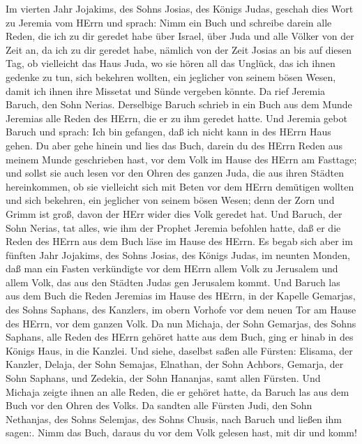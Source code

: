  Im vierten Jahr Jojakims, des Sohns Josias, des Königs
Judas, geschah dies Wort zu Jeremia vom HErrn und sprach: 
Nimm ein Buch und schreibe darein alle Reden, die ich zu dir geredet
habe über Israel, über Juda und alle Völker von der Zeit an, da ich zu
dir geredet habe, nämlich von der Zeit Josias an bis auf diesen Tag,
 ob vielleicht das Haus Juda, wo sie hören all das Unglück,
das ich ihnen gedenke zu tun, sich bekehren wollten, ein jeglicher von
seinem bösen Wesen, damit ich ihnen ihre Missetat und Sünde vergeben
könnte.  Da rief Jeremia Baruch, den Sohn Nerias. Derselbige
Baruch schrieb in ein Buch aus dem Munde Jeremias alle Reden des HErrn,
die er zu ihm geredet hatte.  Und Jeremia gebot Baruch und
sprach: Ich bin gefangen, daß ich nicht kann in des HErrn Haus gehen.
 Du aber gehe hinein und lies das Buch, darein du des HErrn
Reden aus meinem Munde geschrieben hast, vor dem Volk im Hause des HErrn
am Fasttage; und sollst sie auch lesen vor den Ohren des ganzen Juda,
die aus ihren Städten hereinkommen,  ob sie vielleicht sich
mit Beten vor dem HErrn demütigen wollten und sich bekehren, ein
jeglicher von seinem bösen Wesen; denn der Zorn und Grimm ist groß,
davon der HErr wider dies Volk geredet hat.  Und Baruch, der
Sohn Nerias, tat alles, wie ihm der Prophet Jeremia befohlen hatte, daß
er die Reden des HErrn aus dem Buch läse im Hause des HErrn.
 Es begab sich aber im fünften Jahr Jojakims, des Sohns
Josias, des Königs Judas, im neunten Monden, daß man ein Fasten
verkündigte vor dem HErrn allem Volk zu Jerusalem und allem Volk, das
aus den Städten Judas gen Jerusalem kommt.  Und Baruch las
aus dem Buch die Reden Jeremias im Hause des HErrn, in der Kapelle
Gemarjas, des Sohns Saphans, des Kanzlers, im obern Vorhofe vor dem
neuen Tor am Hause des HErrn, vor dem ganzen Volk.  Da nun
Michaja, der Sohn Gemarjas, des Sohns Saphans, alle Reden des HErrn
gehöret hatte aus dem Buch,  ging er hinab in des Königs
Haus, in die Kanzlei. Und siehe, daselbst saßen alle Fürsten: Elisama,
der Kanzler, Delaja, der Sohn Semajas, Elnathan, der Sohn Achbors,
Gemarja, der Sohn Saphans, und Zedekia, der Sohn Hananjas, samt allen
Fürsten.  Und Michaja zeigte ihnen an alle Reden, die er
gehöret hatte, da Baruch las aus dem Buch vor den Ohren des Volks.
 Da sandten alle Fürsten Judi, den Sohn Nethanjas, des
Sohns Selemjas, des Sohns Chusis, nach Baruch und ließen ihm sagen:.
Nimm das Buch, daraus du vor dem Volk gelesen hast, mit dir und komm!
